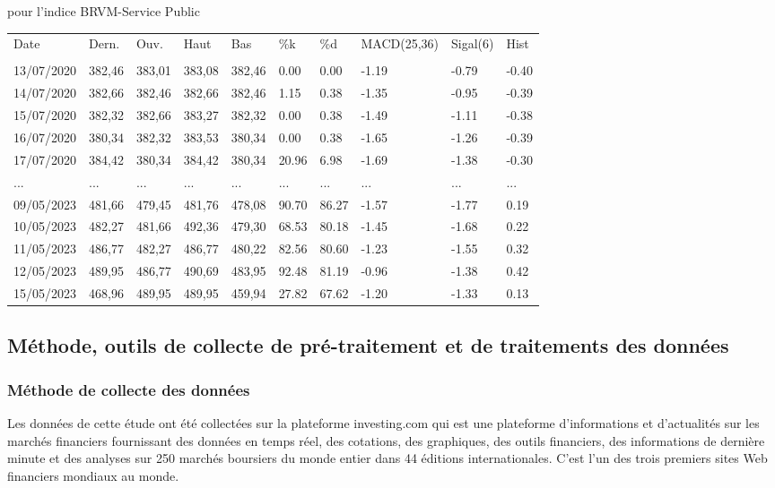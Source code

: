 \begin{samepage}
\begin{center}
\begin{table}[ht]
{		pour l'indice BRVM-Service Public}\label{tab:multirow}
		\begin{tabular}{p{1.5cm}p{1cm}p{1.5cm}p{1cm}p{1cm}p{1cm}p{1cm}p{1.5cm}p{1.5cm}p{1.5cm}}
			\hline
			Date 		&Dern.	&Ouv.	&Haut	&Bas	&\%k	&\%d	&MACD(25,36)	&Sigal(6)	&Hist \\	\\
			\hline                                                       
			13/07/2020	&382,46	&383,01	&383,08	&382,46	&0.00	&0.00	&-1.19	&-0.79	&-0.40 \\ 
			14/07/2020	&382,66	&382,46	&382,66	&382,46	&1.15	&0.38	&-1.35	&-0.95	&-0.39\\ 
			15/07/2020	&382,32	&382,66	&383,27	&382,32	&0.00	&0.38	&-1.49	&-1.11	&-0.38\\ 
			16/07/2020	&380,34	&382,32	&383,53	&380,34	&0.00	&0.38	&-1.65	&-1.26	&-0.39\\ 
			17/07/2020	&384,42	&380,34	&384,42	&380,34	&20.96	&6.98	&-1.69	&-1.38	&-0.30\\ 
			...	&...	&...	&...	&...	&...	&...	&...	&...	&... \\ 
			09/05/2023	&481,66	&479,45	&481,76	&478,08	&90.70	&86.27	&-1.57	&-1.77	&0.19\\ 
			10/05/2023	&482,27	&481,66	&492,36	&479,30	&68.53	&80.18	&-1.45	&-1.68	&0.22\\ 
			11/05/2023	&486,77	&482,27	&486,77	&480,22	&82.56	&80.60	&-1.23	&-1.55	&0.32\\ 
			12/05/2023	&489,95	&486,77	&490,69	&483,95	&92.48	&81.19	&-0.96	&-1.38	&0.42\\ 
			15/05/2023	&468,96	&489,95	&489,95	&459,94	&27.82	&67.62	&-1.20	&-1.33	&0.13\\ 
			\hline
		\end{tabular}
	\end{table}%
\end{center}
\end{samepage}		


\subsection{Méthode, outils de collecte de pré-traitement et de traitements des données} 
\subsubsection{Méthode de collecte des données}
\par{Les données de cette étude ont été collectées sur la plateforme investing.com qui 
est une plateforme d'informations et d'actualités sur les marchés financiers 
fournissant des données en temps réel, des cotations, des graphiques, des outils
financiers, des informations de dernière minute et des analyses sur 250 marchés
boursiers du monde entier dans 44 éditions internationales. C'est l'un des trois premiers sites
Web financiers mondiaux au monde.}	

